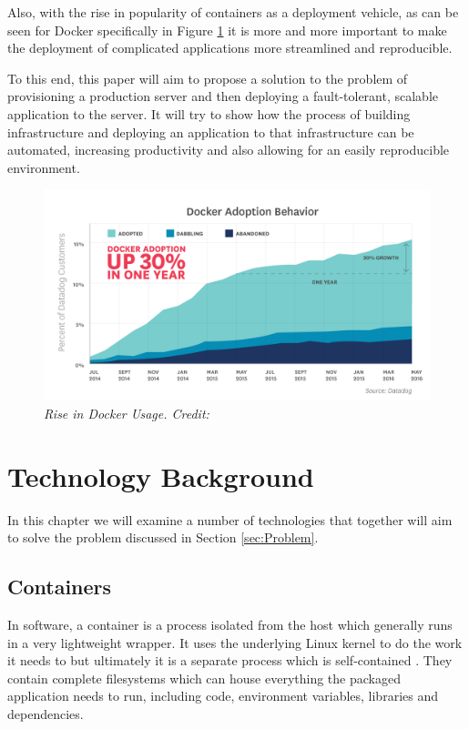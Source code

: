 \documentclass{article}
\begin{document}
Also, with the rise in popularity of containers as a deployment vehicle, as can be seen for Docker specifically in Figure \ref{fig:datadog} it is more and more important to make the deployment of complicated applications more streamlined and reproducible.

To this end, this paper will aim to propose a solution to the problem of provisioning a production server and then deploying a fault-tolerant, scalable application to the server. It will try to show how the process of building infrastructure and deploying an application to that infrastructure can be automated, increasing productivity and also allowing for an easily reproducible environment.

\begin{figure}[!h]
\centering
\includegraphics*[width=1\textwidth]{components/images/datadog}
\caption{\em Rise in Docker Usage. Credit: \citep{datadog}}
\label{fig:datadog}
\end{figure}
 
\newpage
\section{Technology Background}
\label{sec:Background}

In this chapter we will examine a number of technologies that together will aim to solve the problem discussed in Section \ref{sec:Problem}.

\subsection{Containers}
\label{sub:Containers}
In software, a container is a process isolated from the host which generally runs in a very lightweight wrapper. It uses the underlying Linux kernel to do the work it needs to but ultimately it is a separate process which is self-contained \citep{Matthias2015}. They contain complete filesystems which can house everything the packaged application needs to run, including code, environment variables, libraries and dependencies.
\end{document}
